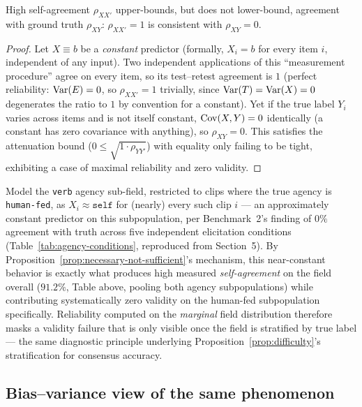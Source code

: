 \begin{proposition}
\label{prop:necessary-not-sufficient}
High self-agreement $\rho_{XX'}$ upper-bounds, but does not lower-bound,
agreement with ground truth $\rho_{XY}$: $\rho_{XX'}=1$ is consistent with
$\rho_{XY}=0$.
\end{proposition}
\begin{proof}
Let $X \equiv b$ be a \emph{constant} predictor (formally, $X_i = b$ for
every item $i$, independent of any input). Two independent applications of
this ``measurement procedure'' agree on every item, so its test--retest
agreement is $1$ (perfect reliability: $\operatorname{Var}(E) = 0$, so $\rho_{XX'}=1$
trivially, since $\operatorname{Var}(T) = \operatorname{Var}(X) = 0$ degenerates the ratio to $1$ by
convention for a constant). Yet if the true label $Y_i$ varies across items
and is not itself constant, $\operatorname{Cov}(X,Y) = 0$ identically (a constant has
zero covariance with anything), so $\rho_{XY} = 0$. This satisfies the
attenuation bound ($0 \le \sqrt{1\cdot\rho_{YY'}}$) with equality only
failing to be tight, exhibiting a case of maximal reliability and zero
validity.
\end{proof}

\begin{corollary}
\label{cor:self-fed}
Model the \texttt{verb} agency sub-field, restricted to clips where the
true agency is \texttt{human-fed}, as $X_i \approx \texttt{self}$ for
(nearly) every such clip $i$ --- an approximately constant predictor on
this subpopulation, per Benchmark~2's finding of $0\%$ agreement with
truth across five independent elicitation conditions
(Table~\ref{tab:agency-conditions}, reproduced from Section~5). By
Proposition~\ref{prop:necessary-not-sufficient}'s mechanism, this
near-constant behavior is exactly what produces high measured
\emph{self-agreement} on the field overall ($91.2\%$, Table above,
pooling both agency subpopulations) while contributing systematically
zero validity on the human-fed subpopulation specifically. Reliability
computed on the \emph{marginal} field distribution therefore masks a
validity failure that is only visible once the field is stratified by
true label --- the same diagnostic principle underlying
Proposition~\ref{prop:difficulty}'s stratification for consensus accuracy.
\end{corollary}

\subsection{Bias--variance view of the same phenomenon}

